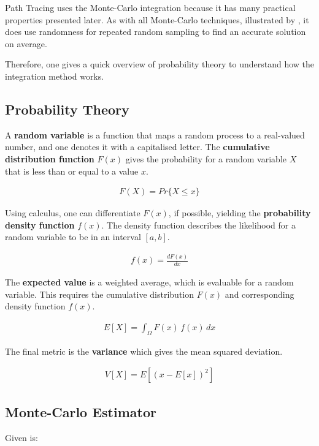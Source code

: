 Path Tracing uses the Monte-Carlo integration because it has many practical properties presented later.
As with all Monte-Carlo techniques, illustrated by \cite{kalos_monte_2008}, it does use randomness for repeated random sampling to find an accurate solution on average.

Therefore, one gives a quick overview of probability theory to understand how the integration method works.

\subsection*{Probability Theory}

A \textbf{random variable} is a function that maps a random process to a real-valued number, and one denotes it with a capitalised letter.
The \textbf{cumulative distribution function} $F(x)$ gives the probability for a random variable $X$ that is less than or equal to a value $x$.

\begin{align*}
F(X)=Pr\{X\le x\}
\end{align*}

Using calculus, one can differentiate $F(x)$, if possible, yielding the \textbf{probability density function} $f(x)$.
The density function describes the likelihood for a random variable to be in an interval $[a,b]$.

\begin{align*}
f(x)=\frac{dF(x)}{dx}
\end{align*}

The \textbf{expected value} is a weighted average, which is evaluable for a random variable.
This requires the cumulative distribution $F(x)$ and corresponding density function $f(x)$.

\begin{align*}
E[X]=\int_{\Omega}F(x)\,f(x)\,dx
\end{align*}

The final metric is the \textbf{variance} which gives the mean squared deviation.

\begin{align*}
V[X]=E\left[(x-E[x])^2\right]
\end{align*}

\subsection*{Monte-Carlo Estimator}

Given is:

